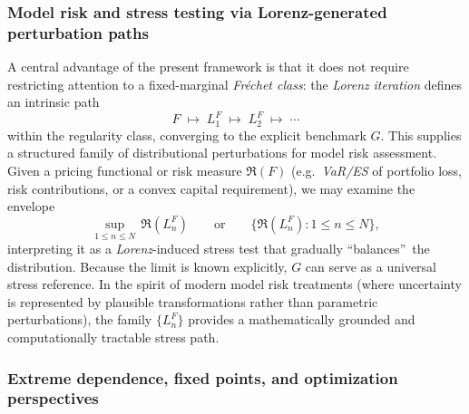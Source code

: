 \documentclass[onecolumn]{article}
\begin{document}
\subsubsection{Model risk and stress testing via Lorenz-generated
perturbation paths}

A central advantage of the present framework is that it does not require
restricting attention to a fixed-marginal \textit{Fr\'{e}chet class}: the 
\textit{Lorenz} \textit{iteration} defines an intrinsic path 
\begin{equation*}
F\;\longmapsto \;L_{1}^{F}\;\longmapsto \;L_{2}^{F}\;\longmapsto \;\cdots
\end{equation*}%
within the regularity class, converging to the explicit benchmark $G$. This
supplies a structured family of distributional perturbations for model risk
assessment. Given a pricing functional or risk measure $\mathfrak{R}(F)$
(e.g.\ \textit{VaR/ES} of portfolio loss, risk contributions, or a convex
capital requirement), we may examine the envelope 
\begin{equation}
\sup_{1\leq n\leq N}\,\mathfrak{R}(L_{n}^{F})\qquad \text{or}\qquad \{%
\mathfrak{R}(L_{n}^{F}):1\leq n\leq N\},  \label{2086}
\end{equation}%
interpreting it as a \textit{Lorenz}-induced stress test that gradually
\textquotedblleft balances\textquotedblright\ the distribution. Because the
limit is known explicitly, $G$ can serve as a universal stress reference. In
the spirit of modern model risk treatments (where uncertainty is represented
by plausible transformations rather than parametric perturbations), the
family $\{L_{n}^{F}\}$ provides a mathematically grounded and
computationally tractable stress path.

\subsubsection{Extreme dependence, fixed points, and optimization
perspectives}
\end{document}
